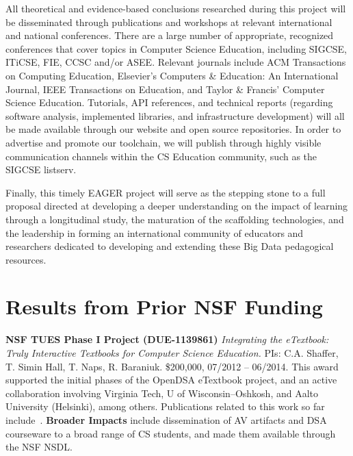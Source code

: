 \documentclass[11pt]{article}
\begin{document}
All theoretical and evidence-based conclusions researched during this project will be disseminated through publications and workshops at relevant international and national conferences. 
There are a large number of appropriate, recognized conferences that cover topics in Computer Science Education, including SIGCSE, ITiCSE, FIE, CCSC and/or ASEE.
Relevant journals include ACM Transactions on Computing Education, Elsevier’s Computers \& Education: An International Journal, IEEE Transactions on Education, and Taylor \& Francis’ Computer Science Education.
Tutorials, API references, and technical reports (regarding software analysis, implemented libraries, and infrastructure development) will all be made available through our website and open source repositories.
In order to advertise and promote our toolchain, we will publish through highly visible communication channels within the CS Education community, such as the SIGCSE listserv.

Finally, this timely EAGER project will serve as the stepping stone to a full proposal directed at developing a deeper understanding on the impact of learning through a longitudinal study, the maturation of the scaffolding technologies, and the leadership in forming an international community of educators and researchers dedicated to developing and extending these Big Data pedagogical resources.

\section{Results from Prior NSF Funding}

\textbf{NSF TUES Phase I Project (DUE-1139861)}
\emph{Integrating the eTextbook: Truly Interactive Textbooks for Computer
Science Education.} PIs: C.A. Shaffer, T. Simin Hall, T. Naps,
R. Baraniuk.
\$200,000, 07/2012 -- 06/2014.
This award supported the initial phases of the OpenDSA eTextbook
project, and an active collaboration involving Virginia Tech, U of
Wisconsin--Oshkosh, and Aalto University (Helsinki), among others.
Publications related to this work so far
include~\cite{ShafferSIGCSE11,ShafferPVW11,ShafferKoli11,Fouh:AV12,KorhonenWG13,Karavirta:ITiCSE13,Hall13,Fouh14}.
\textbf{Broader Impacts}
include dissemination of AV artifacts and DSA courseware to a broad
range of CS students, and made them available through the NSF NSDL.
\end{document}
